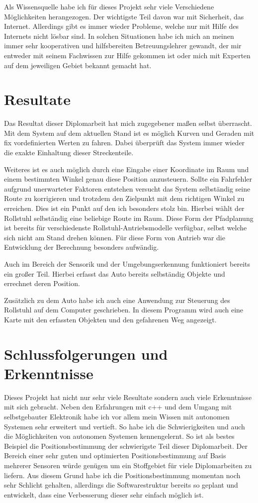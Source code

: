 Als Wissensquelle habe ich für dieses Projekt sehr viele Verschiedene Möglichkeiten herangezogen.
Der wichtigste Teil davon war mit Sicherheit, das Internet.
Allerdings gibt es immer wieder Probleme, welche nur mit Hilfe des Internets nicht lösbar sind.
In solchen Situationen habe ich mich an meinen immer sehr kooperativen und hilfsbereiten Betreuungslehrer gewandt, der mir entweder mit seinem Fachwissen zur Hilfe gekommen ist oder mich mit Experten auf dem jeweiligen Gebiet bekannt gemacht hat.


\section{Resultate}
Das Resultat dieser Diplomarbeit hat mich zugegebener maßen selbst überrascht.
Mit dem System auf dem aktuellen Stand ist es möglich Kurven und Geraden mit fix vordefinierten Werten zu fahren.
Dabei überprüft das System immer wieder die exakte Einhaltung dieser Streckenteile.

Weiteres ist es auch möglich durch eine Eingabe einer Koordinate im Raum und einem bestimmten Winkel genau diese Position anzusteuern.
Sollte ein Fahrfehler aufgrund unerwarteter Faktoren entstehen versucht das System selbständig seine Route zu korrigieren und trotzdem den Zielpunkt mit dem richtigen Winkel zu erreichen.
Dies ist ein Punkt auf den ich besonders stolz bin.
Hierbei wählt der Rollstuhl selbständig eine beliebige Route im Raum.
Diese Form der Pfadplanung ist bereits für verschiedenste Rollstuhl-Antriebsmodelle verfügbar, selbst welche sich nicht am Stand drehen können.
Für diese Form von Antrieb war die Entwicklung der Berechnung besonders aufwändig.

Auch im Bereich der Sensorik und der Umgebungserkennung funktioniert bereits ein großer Teil.
Hierbei erfasst das Auto bereits selbständig Objekte und errechnet deren Position.

Zusätzlich zu dem Auto habe ich auch eine Anwendung zur Steuerung des Rollstuhl auf dem Computer geschrieben.
In diesem Programm wird auch eine Karte mit den erfassten Objekten und den gefahrenen Weg angezeigt.


\section{Schlussfolgerungen und Erkenntnisse}
Dieses Projekt hat nicht nur sehr viele Resultate sondern auch viele Erkenntnisse mit sich gebracht.
Neben den Erfahrungen mit c++ und dem Umgang mit selbstgebauter Elektronik habe ich vor allem mein Wissen mit autonomen Systemen sehr erweitert und vertieft.
So habe ich die Schwierigkeiten und auch die Möglichkeiten von autonomen Systemen kennengelernt.
So ist als bestes Beispiel die Positionsbestimmung der schwierigste Teil dieser Diplomarbeit.
Der Bereich einer sehr guten und optimierten Positionsbestimmung auf Basis mehrerer Sensoren würde genügen um ein Stoffgebiet für viele Diplomarbeiten zu liefern.
Aus diesem Grund habe ich die Positionsbestimmung momentan noch sehr Schlicht gehalten, allerdings die Softwarestruktur bereits so geplant und entwickelt, dass eine Verbesserung dieser sehr einfach möglich ist.


